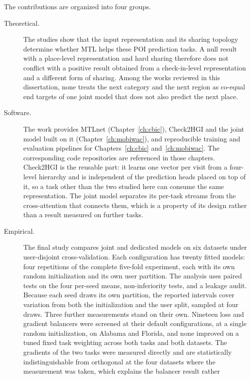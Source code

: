 The contributions are organized into four groups.

\begin{description}
    \item[Theoretical.] The studies show that the input representation and its sharing
    topology determine whether MTL helps these POI prediction tasks. A null result
    with a place-level representation and hard sharing therefore does not conflict
    with a positive result obtained from a check-in-level representation and a
    different form of sharing. Among the works reviewed in this dissertation, none treats
    the next category and the next region as co-equal end targets of one joint model that
    does not also predict the next place.
    \item[Software.] The work provides MTLnet (Chapter~\ref{ch:cbic}), Check2HGI and the
    joint model built on it (Chapter~\ref{ch:mobiwac}), and reproducible training
    and evaluation pipelines for Chapters~\ref{ch:cbic} and~\ref{ch:mobiwac}. The
    corresponding code repositories are referenced in those chapters. Check2HGI is the
    reusable part: it learns one vector per visit from a four-level hierarchy and is
    independent of the prediction heads placed on top of it, so a task other than the
    two studied here can consume the same representation. The joint model separates its
    per-task streams from the cross-attention that connects them, which is a property of
    its design rather than a result measured on further tasks.
    \item[Empirical.] The final study compares joint and dedicated models on six
    datasets under user-disjoint cross-validation. Each configuration has twenty
    fitted models: four repetitions of the complete five-fold experiment, each
    with its own random initialization and its own user partition. The analysis
    uses paired tests on the four per-seed means, non-inferiority tests, and a
    leakage audit. Because each seed draws its own partition, the reported intervals
    cover variation from both the initialization and the user split, sampled at four
    draws. Three further measurements stand on their own. Nineteen loss and gradient
    balancers were screened at their default configurations, at a single random
    initialization, on Alabama and Florida, and none improved on a tuned fixed task
    weighting across both tasks and both datasets. The gradients of the two tasks were
    measured directly and are statistically indistinguishable from orthogonal at the four
    datasets where the measurement was taken, which explains the balancer result rather

\end{description}
